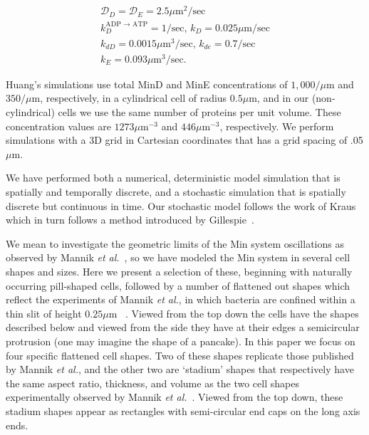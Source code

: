 \documentclass[letterpaper,twocolumn,amsmath,amssymb,pre]{revtex4-1}
\newcommand\micron{\ensuremath{\mu\text{m}}}
\begin{document}
\begin{gather*}
  \mathcal{D}_D = \mathcal{D}_{E} = 2.5\micron^2/\text{sec}\\
  k_D^{\textrm{ADP $\rightarrow$ ATP}} = 1/\textrm{sec,  }
  k_D = 0.025 \micron /\textrm{sec}\\
  k_{dD} = 0.0015 \micron^3/ \textrm{sec,  }
  k_{de} = 0.7/\textrm{sec}\\
  k_E = 0.093 \micron^3 /\textrm{sec}.
\end{gather*}

Huang's simulations use total MinD and MinE concentrations of
$1,000/\micron$ and $350/\micron$, respectively, in a cylindrical cell
of radius $0.5\micron$, and in our (non-cylindrical) cells we use the
same number of proteins per unit volume.  These concentration values
are $1273\micron^{-3}$ and $446\micron^{-3}$, respectively. We perform
simulations with a 3D grid in Cartesian coordinates that has a grid
spacing of .05\micron.

We have performed both a numerical, deterministic model simulation
that is spatially and temporally discrete, and a stochastic simulation
that is spatially discrete but continuous in time.  Our stochastic
model follows the work of Kraus~\cite{kraus1996crosstalk} which in
turn follows a method introduced by
Gillespie~\cite{gillespie1977exact}.

We mean to investigate the geometric limits of the Min system
oscillations as observed by Mannik \emph{et
  al.}~\cite{mannik2012robustness}, so we have modeled the Min system
in several cell shapes and sizes.  Here we present a selection of
these, beginning with naturally occurring pill-shaped cells, followed
by a number of flattened out shapes which reflect the experiments of
Mannik \emph{et al.}, in which bacteria are confined within a thin
slit of height $0.25\micron$ ~\cite{mannik2012robustness}.  Viewed
from the top down the cells have the shapes described below and viewed
from the side they have at their edges a semicircular protrusion (one
may imagine the shape of a pancake).
%
In this paper we focus on four specific flattened cell shapes.  Two of
these shapes replicate those published by Mannik \emph{et al.}, and
the other two are `stadium' shapes that respectively have the same
aspect ratio, thickness, and volume as the two cell shapes
experimentally observed by Mannik \emph{et
  al.}~\cite{mannik2012robustness}.  Viewed from the top down, these
stadium shapes appear as rectangles with semi-circular end caps on the
long axis ends.
\end{document}
